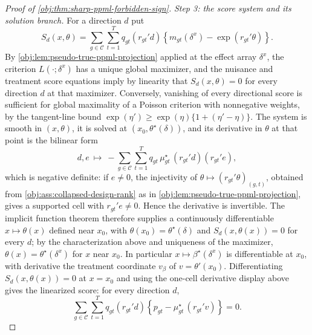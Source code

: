 \documentclass[11pt]{article}
\begin{document}
\begin{proof}[Proof of \cref{obj:thm:sharp-ppml-forbidden-sign}]
\textit{Step 3: the score system and its solution branch.} For a direction \(d\) put
\[
S_d(x,\theta)
=
\sum_{g\in\mathcal C}\sum_{t=1}^T q_{gt}(r_{gt}'d)\left\{m_{gt}(\delta^x)-\exp(r_{gt}'\theta)\right\}.
\]
By \cref{obj:lem:pseudo-true-ppml-projection} applied at the effect array \(\delta^x\), the criterion \(L(\cdot;\delta^x)\) has a unique global maximizer, and the nuisance and treatment score equations imply by linearity that \(S_d(x,\theta)=0\) for every direction \(d\) at that maximizer. Conversely, vanishing of every directional score is sufficient for global maximality of a Poisson criterion with nonnegative weights, by the tangent-line bound \(\exp(\eta')\ge\exp(\eta)\{1+(\eta'-\eta)\}\).
The system is smooth in \((x,\theta)\), it is solved at \((x_0,\theta^\star(\delta))\), and its derivative in \(\theta\) at that point is the bilinear form
\[
d,e\ \mapsto\ -\sum_{g\in\mathcal C}\sum_{t=1}^T q_{gt}\,\mu^\star_{gt}\,(r_{gt}'d)(r_{gt}'e),
\]
which is negative definite: if \(e\neq0\), the injectivity of \(\theta\mapsto(r_{gt}'\theta)_{(g,t)}\), obtained from \cref{obj:ass:collapsed-design-rank} as in \cref{obj:lem:pseudo-true-ppml-projection}, gives a supported cell with \(r_{gt}'e\neq0\). Hence the derivative is invertible. The implicit function theorem therefore supplies a continuously differentiable \(x\mapsto\theta(x)\) defined near \(x_0\), with \(\theta(x_0)=\theta^\star(\delta)\) and \(S_d(x,\theta(x))=0\) for every \(d\); by the characterization above and uniqueness of the maximizer, \(\theta(x)=\theta^\star(\delta^x)\) for \(x\) near \(x_0\). In particular \(x\mapsto\beta^\star(\delta^x)\) is differentiable at \(x_0\), with derivative the treatment coordinate \(v_\beta\) of \(v=\theta'(x_0)\).
Differentiating \(S_d(x,\theta(x))=0\) at \(x=x_0\) and using the one-cell derivative display above gives the linearized score: for every direction \(d\),
\[
\sum_{g\in\mathcal C}\sum_{t=1}^T
q_{gt}(r_{gt}'d)
\left\{
p_{gt}-\mu^\star_{gt}\,(r_{gt}'v)
\right\}=0 .
\]


\end{proof}
\end{document}

